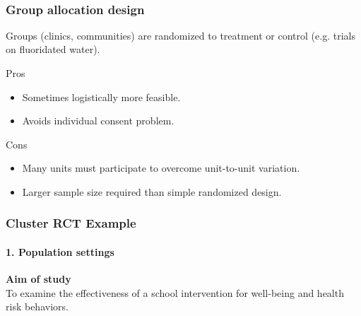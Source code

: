 \documentclass[table,10pt]{beamer}
\begin{document}
\begin{CJK*}{UTF8}{gbsn}
\begin{frame}[t]

\\
\end{frame}


\begin{frame}[t]
\frametitle{Group allocation design}
Groups (clinics, communities) are randomized to treatment or control (e.g. 
trials on fluoridated water).
\begin{alertblock}{Pros}
\begin{itemize}
	\item Sometimes logistically more feasible.
	\item Avoids individual consent problem.
\end{itemize}
\end{alertblock}
\begin{alertblock}{Cons}
\begin{itemize}
	\item Many units must participate to overcome unit-to-unit variation.
	\item Larger sample size required than simple randomized design.
\end{itemize}
\end{alertblock}
\end{frame}


\begin{frame}[t]
\frametitle{Cluster RCT Example}
\framesubtitle{1. Population settings}
\footnotesize
\textbf{Aim of study}\\
To examine the effectiveness of a school intervention for well-being and 
health risk behaviors.


\end{frame}
\end{CJK*}
\end{document}
